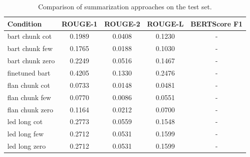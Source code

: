 \begin{table}[h]
\centering
\begin{tabular}{lcccc}
\hline
\textbf{Condition} & \textbf{ROUGE-1} & \textbf{ROUGE-2} & \textbf{ROUGE-L} & \textbf{BERTScore F1} \\
\hline
bart chunk cot & 0.1989 & 0.0408 & 0.1230 & - \\
bart chunk few & 0.1765 & 0.0188 & 0.1030 & - \\
bart chunk zero & 0.2249 & 0.0516 & 0.1467 & - \\
finetuned bart & 0.4205 & 0.1330 & 0.2476 & - \\
flan chunk cot & 0.0733 & 0.0148 & 0.0481 & - \\
flan chunk few & 0.0770 & 0.0086 & 0.0551 & - \\
flan chunk zero & 0.1164 & 0.0212 & 0.0700 & - \\
led long cot & 0.2773 & 0.0559 & 0.1548 & - \\
led long few & 0.2712 & 0.0531 & 0.1599 & - \\
led long zero & 0.2712 & 0.0531 & 0.1599 & - \\
\hline
\end{tabular}
\caption{Comparison of summarization approaches on the test set.}
\label{tab:results}
\end{table}
